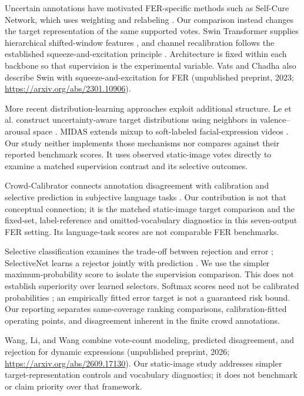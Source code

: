 \documentclass[pdflatex,sn-mathphys-num]{sn-jnl}
\begin{document}
Uncertain annotations have motivated FER-specific methods such as Self-Cure Network, which uses weighting and relabeling \cite{wang2020scn}. Our comparison instead changes the target representation of the same supported votes. Swin Transformer supplies hierarchical shifted-window features \cite{liu2021swin}, and channel recalibration follows the established squeeze-and-excitation principle \cite{hu2018senet}. Architecture is fixed within each backbone so that supervision is the experimental variable.
Vats and Chadha also describe Swin with squeeze-and-excitation for FER (unpublished preprint, 2023; \url{https://arxiv.org/abs/2301.10906}).

More recent distribution-learning approaches exploit additional structure. Le et al. construct uncertainty-aware target distributions using neighbors in valence--arousal space \cite{le2023uncertainty}. MIDAS extends mixup to soft-labeled facial-expression videos \cite{kawamura2024midas}. Our study neither implements those mechanisms nor compares against their reported benchmark scores. It uses observed static-image votes directly to examine a matched supervision contrast and its selective outcomes.

Crowd-Calibrator connects annotation disagreement with calibration and selective prediction in subjective language tasks \cite{khurana2024crowd}. Our contribution is not that conceptual connection; it is the matched static-image target comparison and the fixed-set, label-reference and omitted-vocabulary diagnostics in this seven-output FER setting. Its language-task scores are not comparable FER benchmarks.

Selective classification examines the trade-off between rejection and error \cite{geifman2017selective}; SelectiveNet learns a rejector jointly with prediction \cite{geifman2019selectivenet}. We use the simpler maximum-probability score to isolate the supervision comparison. This does not establish superiority over learned selectors. Softmax scores need not be calibrated probabilities \cite{guo2017calibration}; an empirically fitted error target is not a guaranteed risk bound. Our reporting separates same-coverage ranking comparisons, calibration-fitted operating points, and disagreement inherent in the finite crowd annotations.

Wang, Li, and Wang combine vote-count modeling, predicted disagreement, and rejection for dynamic expressions (unpublished preprint, 2026; \url{https://arxiv.org/abs/2609.17130}). Our static-image study addresses simpler target-representation controls and vocabulary diagnostics; it does not benchmark or claim priority over that framework.
\end{document}
